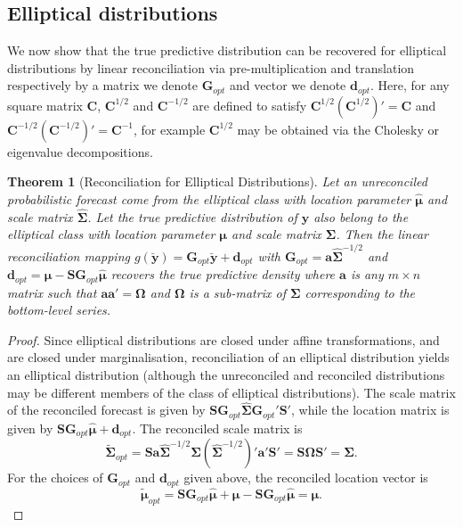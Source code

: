 \documentclass[12pt]{article}
\newtheorem{theo}{Theorem}[section]
\theoremstyle{definition}
\begin{document}
\subsection{Elliptical distributions}

We now show that the true predictive distribution can be recovered for elliptical distributions by linear reconciliation via pre-multiplication and translation respectively by a matrix we denote ${\bm G}_{opt}$ and vector we denote  ${\bm d}_{opt}$. Here, for any square matrix $\bm{C}$, $\bm{C}^{1/2}$ and $\bm{C}^{-1/2}$ are defined to satisfy $\bm{C}^{1/2}(\bm{C}^{1/2})'=\bm{C}$ and $\bm{C}^{-1/2}(\bm{C}^{-1/2})'=\bm{C}^{-1}$, for example $\bm{C}^{1/2}$ may be obtained via the Cholesky or eigenvalue decompositions.

\begin{theo}[Reconciliation for Elliptical Distributions]
	Let an unreconciled probabilistic forecast come from the elliptical class with location parameter $\hat{\bm{\mu}}$ and scale matrix $\hat{\bm{\Sigma}}$. Let the true predictive distribution of $\bm{y}$ also belong to the elliptical class with location parameter $\bm{\mu}$ and scale matrix $\bm{\Sigma}$. Then the linear reconciliation mapping $g(\breve{\bm{y}})=\bm{G}_{opt}\breve{\bm{y}}+\bm{d}_{opt}$ with $\bm{G}_{opt}={\bm{a}}\hat{\bm\Sigma}^{-1/2}$ and $\bm{d}_{opt}=\bm{\mu}-\bm{S}\bm{G}_{opt}\hat{\bm{\mu}}$ recovers the true predictive density where ${\bm{a}}$ is any $m\times n$ matrix such that ${\bm{a}}{\bm{a}}'=\bm{\Omega}$ and $\bm{\Omega}$ is a sub-matrix of $\bm{\Sigma}$ corresponding to the bottom-level series.
\end{theo}

\begin{proof}
   Since elliptical distributions are closed under affine transformations, and are closed under marginalisation, reconciliation of an elliptical distribution yields an elliptical distribution (although the unreconciled and reconciled distributions may be different members of the class of elliptical distributions). The scale matrix of the reconciled forecast is given by $\bm{S}\bm{G}_{opt}\hat{\bm{\Sigma}}\bm{G}_{opt}'\bm{S}'$, while the location matrix is given by $\bm{S}\bm{G}_{opt}\hat{\bm{\mu}}+\bm{d}_{opt}$. The reconciled scale matrix is
   \[
     \tilde{\bm{\Sigma}}_{opt}
       = \bm{S}{\bm{a}}\hat{\bm\Sigma}^{-1/2}\hat{\bm{\Sigma}}\left(\hat{\bm\Sigma}^{-1/2}\right)'{\bm{a}}'\bm{S}'
       = \bm{S}\bm{\Omega}\bm{S}'
       = \bm{\Sigma}.
   \]
   For the choices of $\bm{G}_{opt}$ and $\bm{d}_{opt}$ given above, the reconciled location vector is
   \[
     \tilde{\bm{\mu}}_{opt}= \bm{S}\bm{G}_{opt}\hat{\bm{\mu}}+\bm{\mu}-\bm{S}\bm{G}_{opt}\hat{\bm{\mu}}
   = \bm{\mu}.
   \]
\end{proof}
\end{document}
